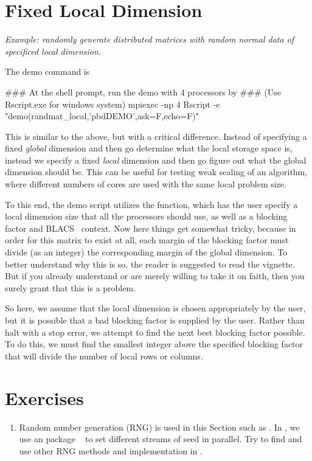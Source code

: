 \section{Fixed Local Dimension}

\emph{Example:  randomly generate distributed matrices with random normal data of specificed local dimension.}

The demo command is
\begin{Command}
### At the shell prompt, run the demo with 4 processors by
### (Use Rscript.exe for windows system)
mpiexec -np 4 Rscript -e "demo(randmat_local,'pbdDEMO',ask=F,echo=F)"
\end{Command}

This is similar to the above, but with a critical difference.  Instead of specifying a fixed \emph{global} dimension and then go determine what the local storage space is, instead we specify a fixed \emph{local} dimension and then go figure out what the global dimension should be.  This can be useful for testing weak scaling of an algorithm, where different numbers of cores are used with the same local problem size.

To this end, the demo script utilizes the  function, which has the user specify a local dimension size that all the processors should use, as well as a blocking factor and BLACS~ context.  Now here things get somewhat tricky, because in order for this matrix to exist at all, each margin of the blocking factor must divide (as an integer) the corresponding margin of the global dimension.  To better understand why this is so, the reader is suggested to read the  vignette.  But if you already understand or are merely willing to take it on faith, then you surely grant that this is a problem.

So here, we assume that the local dimension is chosen appropriately by the user, but it is possible that a bad blocking factor is supplied by the user.  Rather than halt with a stop error, we attempt to find the next best blocking factor possible.  To do this, we must find the smallest integer above the specified blocking factor that will divide the number of local rows or columns.




\section{Exercises}
\label{sec:statistics_exercise}

\begin{enumerate}[label=\thechapter-\arabic*]
\item
Random number generation (RNG) is used in this Section such as .
In , we use an  package
~\citep{rlecuyer} to set different streams of seed in
parallel. Try to find and use other RNG methods and implementation
in .

\end{enumerate}
